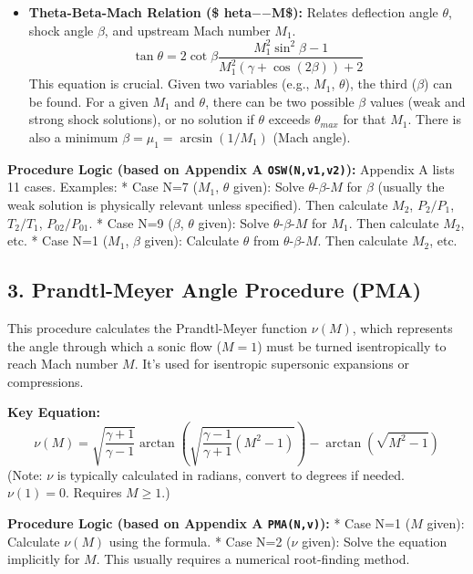 \begin{itemize}
\item
  \textbf{Theta-Beta-Mach Relation (\$ heta\(-\)\beta\(-\)M\$):} Relates
  deflection angle \(\theta\), shock angle \(\beta\), and upstream Mach
  number \(M_1\).
  \[ \tan\theta = 2 \cot\beta \frac{M_1^2 \sin^2\beta - 1}{M_1^2 (\gamma + \cos(2\beta)) + 2} \]
  This equation is crucial. Given two variables (e.g., \(M_1\),
  \(\theta\)), the third (\(\beta\)) can be found. For a given \(M_1\)
  and \(\theta\), there can be two possible \(\beta\) values (weak and
  strong shock solutions), or no solution if \(\theta\) exceeds
  \(\theta_{max}\) for that \(M_1\). There is also a minimum
  \(\beta = \mu_1 = \arcsin(1/M_1)\) (Mach angle).
\end{itemize}

\textbf{Procedure Logic (based on Appendix A \texttt{OSW(N,v1,v2)}):}
Appendix A lists 11 cases. Examples: * Case N=7 (\(M_1\), \(\theta\)
given): Solve \(\theta\)-\(\beta\)-\(M\) for \(\beta\) (usually the weak
solution is physically relevant unless specified). Then calculate
\(M_2\), \(P_2/P_1\), \(T_2/T_1\), \(P_{02}/P_{01}\). * Case N=9
(\(\beta\), \(\theta\) given): Solve \(\theta\)-\(\beta\)-\(M\) for
\(M_1\). Then calculate \(M_2\), etc. * Case N=1 (\(M_1\), \(\beta\)
given): Calculate \(\theta\) from \(\theta\)-\(\beta\)-\(M\). Then
calculate \(M_2\), etc.

\hypertarget{prandtl-meyer-angle-procedure-pma}{%
\subsection{3. Prandtl-Meyer Angle Procedure
(PMA)}\label{prandtl-meyer-angle-procedure-pma}}

This procedure calculates the Prandtl-Meyer function \(\nu(M)\), which
represents the angle through which a sonic flow (\(M=1\)) must be turned
isentropically to reach Mach number \(M\). It's used for isentropic
supersonic expansions or compressions.

\textbf{Key Equation:}
\[ \nu(M) = \sqrt{\frac{\gamma+1}{\gamma-1}} \arctan\left( \sqrt{\frac{\gamma-1}{\gamma+1}(M^2-1)} \right) - \arctan\left( \sqrt{M^2-1} \right) \]
(Note: \(\nu\) is typically calculated in radians, convert to degrees if
needed. \(\nu(1) = 0\). Requires \(M \ge 1\).)

\textbf{Procedure Logic (based on Appendix A \texttt{PMA(N,v)}):} * Case
N=1 (\(M\) given): Calculate \(\nu(M)\) using the formula. * Case N=2
(\(\nu\) given): Solve the equation implicitly for \(M\). This usually
requires a numerical root-finding method.

